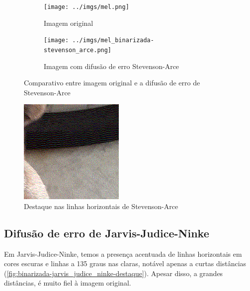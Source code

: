 \documentclass[brazilian,a4paper,twocolumn]{article}
\begin{document}
        \begin{figure}
            \centering
            \begin{subfigure}{0.24\textwidth}
                \texttt{[image: ../imgs/mel.png]}
                \caption{Imagem original}
            \end{subfigure}
            \begin{subfigure}{0.24\textwidth}
                \texttt{[image: ../imgs/mel\_binarizada-stevenson\_arce.png]}
                \caption{Imagem com difusão de erro Stevenson-Arce}
            \end{subfigure}

            \caption{Comparativo entre imagem original e a difusão de erro de Stevenson-Arce}
            \label{fig:binarizada-stevenson_arce}
        \end{figure}

        \begin{figure}
            \centering
            \includegraphics[width=0.45\textwidth,keepaspectratio]{../imgs/mel_binarizada-stevenson_arce-detalhe1.png}
            \caption{Destaque nas linhas horizontais de Stevenson-Arce}
            \label{fig:binarizada-stevenson_arce-destaque}
        \end{figure}


    \subsection{Difusão de erro de Jarvis-Judice-Ninke}

        Em Jarvis-Judice-Ninke, temos a presença acentuada de linhas horizontais em cores escuras e linhas a 135 graus nas claras, notável apenas a curtas distâncias (\cref{fig:binarizada-jarvis_judice_ninke-destaque}). Apesar disso, a grandes distâncias, é muito fiel à imagem original.
\end{document}
